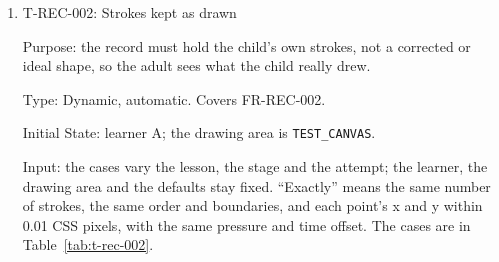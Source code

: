 \documentclass[12pt, titlepage]{article}
\newcommand{\testitem}[1]{\item #1\par\nopagebreak}
\begin{document}
\begin{enumerate}
Output: the expected output of each case is in its row of
Table~\ref{tab:t-rec-001}; the test passes when every case gives it. The
test database holds exactly ten attempt records, all under learner A, in the
order of Table~\ref{tab:t-rec-001}, each holding exactly the fields in its
row.

Test Case Derivation: the fit criterion asks for known lessons, stages,
results and outcomes, with one pass and one fail at each drawing stage, in
the order the attempts ended. The outcomes follow from calibration
($r(\mathrm{F}) \le 60$ and $r(\mathrm{P}) \ge 90$, against
\texttt{STAGE\_PASS} 80). Attempt 7 is not passed because it is incomplete
(SRS FR-LRN-011), although $r(\mathrm{M})$ is at least
\texttt{CAL\_INCOMPLETE\_MIN}; attempt 8 passes because
$r(\mathrm{S}) \ge 90$. Attempts 2, 4 and 8 change the stage when they
pass, so they try to cause H-MUH-003 (a), where the stage is ``taken from
the lesson's stage when the save completes rather than when the child
drew''. The controlled clock makes the times exact. Attempts 9 and 10 check
the order when times are close.

How test will be performed: Playwright with a controlled clock, then a
database read.

\testitem{T-REC-002: Strokes kept as drawn}

Purpose: the record must hold the child's own strokes, not a corrected or
ideal shape, so the adult sees what the child really drew.

Type: Dynamic, automatic. Covers FR-REC-002.

Initial State: learner A; the drawing area is \texttt{TEST\_CANVAS}.

Input: the cases vary the lesson, the stage and the attempt; the learner,
the drawing area and the defaults stay fixed. ``Exactly'' means the same
number of strokes, the same order and boundaries, and each point's x and y
within 0.01 CSS pixels, with the same pressure and time offset. The cases
are in Table~\ref{tab:t-rec-002}.


\end{enumerate}
\end{document}
